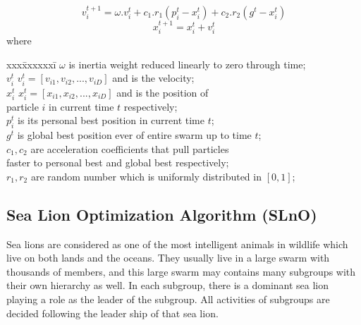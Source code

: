 \documentclass[a4paper,13pt,2p]{report}
\begin{document}
\begin{equation} \label{eq_pso_1}
v_i^{t+1} = \omega.v_i^t + c_1.r_1(p_i^t - x_i^t) + c_2.r_2(g^t - x_i^t)
\end{equation}
\begin{equation} \label{eq_pso_2}
x_i^{t+1} = x_i^t + v_i^t
\end{equation}
where 
\begin{tabbing}
	xxx\=xxxxxxi\=\kill
	\>	$\omega$			\>	is inertia weight reduced linearly to zero through time; \\
	\>	$v_i^t$			\>	$v_i^t = [v_{i1}, v_{i2}, ..., v_{iD}]$ and is the velocity;	\\
	\>	$x_i^t$			\>	$x_i^t = [x_{i1}, x_{i2}, ..., x_{iD}]$ and is the position of 	\\
	\> 	\phantom{inv}	\> 	particle $i$ in current time $t$ respectively;\\
	\>	$p_i^t$			\>	is its personal best position in current time $t$; \\
	\>	$g^t$			\>	is global best position ever of entire swarm up to time $t$; \\
	\>	$c_1, c_2$ 		\>	are acceleration coefficients that pull particles \\
	\>	\phantom{inv} 	\>	faster to personal best and global best respectively;\\
	\>	$r_1, r_2$ 		\>	are random number which is uniformly distributed in $[0,1]$; \\
\end{tabbing}
\subsection{Sea Lion Optimization Algorithm (SLnO)}
\label{slno_standard} 

	Sea lions are considered as one of the most intelligent animals in wildlife which live on both lands and the oceans. They usually live in a large swarm with thousands of members, and this large swarm may contains many subgroups with their own hierarchy as well. In each subgroup, there is a dominant sea lion playing a role as the leader of the subgroup. All activities of subgroups are decided following the leader ship of that sea lion.
	
	
\end{document}
